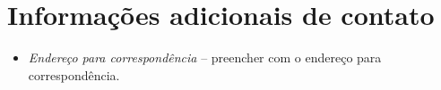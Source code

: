\section{Informações adicionais de contato}
\begin{itemize}
	\item \emph{Endereço para correspondência} -- preencher com o endereço para correspondência.
\end{itemize}
